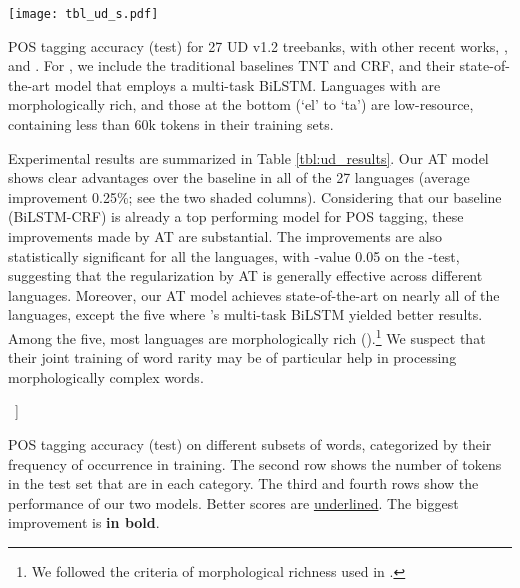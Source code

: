 \documentclass[11pt,a4paper]{article}
\begin{document}
\begin{table}[!t]
    \hspace{-2mm}\vspace{-1mm}
    \texttt{[image: tbl\_ud\_s.pdf]}
    \caption{
    POS tagging accuracy (test) for 27 UD v1.2 treebanks, with other recent works,  \protect{}, \protect{} and \protect{}.
    For \protect{}, we include the traditional baselines TNT and CRF, and their state-of-the-art model that employs a multi-task BiLSTM.
    Languages with  are morphologically rich, and 
    those at the bottom (`el' to `ta') are low-resource, containing less than 60k tokens in their training sets.
    }
\label{tbl:ud_results}
\vspace{-4mm}
\end{table}




Experimental results are summarized in Table \ref{tbl:ud_results}.
Our AT model shows clear advantages over the baseline in all of the 27 languages (average improvement 0.25\%; see the two shaded columns). 
Considering that our baseline (BiLSTM-CRF) is already a top performing model for POS tagging,
these improvements made by AT are substantial.
The improvements are also statistically significant for all the languages, with -value \scalebox{0.9}{} 0.05 on the -test,
suggesting that the regularization by AT is generally effective across different languages.
Moreover, our AT model achieves state-of-the-art on nearly all of the languages, except the five where 
's multi-task BiLSTM yielded better results.
Among the five, most languages are morphologically rich ().\footnote{We followed the criteria of morphological richness used in .} 
We suspect that their joint training of word rarity may be of particular help in processing morphologically complex words.

\begin{table}[!t]
    \setlength{\extrarowheight}{1.7pt}
    ~\-1mm]
    
    \caption{POS tagging accuracy (test) on different subsets of words, categorized by their frequency of occurrence in training.
    The second row shows the number of tokens in the test set that are in each category. 
    The third and fourth rows show the performance of our two models.
    Better scores are \uline{underlined}. The biggest improvement is {\bf in bold}.
    }
    \label{table:word_freq}
    \vspace{-4mm}
\end{table}
\end{document}
